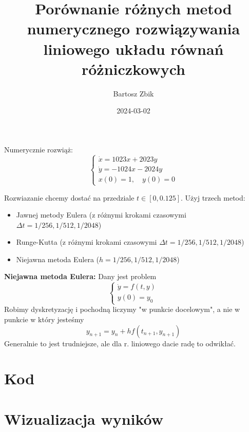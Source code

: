 \documentclass[12pt]{article}
\title{Porównanie różnych metod numerycznego rozwiązywania liniowego układu równań różniczkowych}
\author{Bartosz Zbik}
\date{2024-03-02} %
\begin{document}
\maketitle %

Numerycznie rozwiąż:
\begin{equation}
\begin{cases}
\dot x = 1023 x + 2023 y \\
\dot y = -1024 x - 2024 y \\
x(0) = 1,\quad y(0) = 0
\end{cases}
\end{equation}

Rozwiazanie chcemy dostać na przedziale $t \in [0, 0.125]$. Użyj trzech metod:
\begin{itemize}
\item Jawnej metody Eulera (z różnymi krokami czasowymi $\Delta t = 1/256, 1/512, 1/2048$)
\item Runge-Kutta (z różnymi krokami czasowymi $\Delta t = 1/256, 1/512, 1/2048$)
\item Niejawna metoda Eulera  ($h = 1/256, 1/512, 1/2048$)
\end{itemize}

\textbf{Niejawna metoda Eulera:} Dany jest problem
\begin{equation}
\begin{cases}
\dot y = f(t, y) \\
y(0) = y_0
\end{cases}
\end{equation}
Robimy dyskretyzację i pochodną liczymy "w punkcie docelowym", a nie w punkcie w który jesteśmy
\begin{equation}
y_{n+1} = y_n + h f(t_{n+1}, y_{n+1})
\end{equation}
Generalnie to jest trudniejsze, ale dla r. liniowego dacie radę to odwikłać.


\section{Kod}



\section{Wizualizacja wyników}
\end{document}
